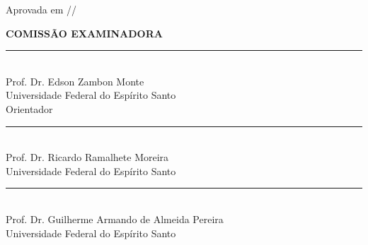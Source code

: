 \documentclass[
  12pt,
  a4paper,
  oneside,
  brazil,
  chapter=TITLE,
  section=TITLE
]{abntex2}
\begin{document}

\frenchspacing

\imprimircapa

\imprimirfolhaderosto

\begin{folhadeaprovacao}
  \begin{center}
    {\ABNTEXchapterfont\large\imprimirautor}
    \vspace*{\fill}\vspace*{\fill}
    \begin{center}
      \ABNTEXchapterfont\bfseries\Large\imprimirtitulo
    \end{center}
    \vspace*{\fill}
    \hspace{.45\textwidth}
    \begin{minipage}{.5\textwidth}
      \imprimirpreambulo
    \end{minipage}
    \vspace*{\fill}
  \end{center}
  Aprovada em \underline{\hspace{1cm}}/\underline{\hspace{1cm}}/\underline{\hspace{1.5cm}}
  \vspace*{\fill}
  \begin{center}
    \textbf{COMISSÃO EXAMINADORA}\\[1.5cm]
    \rule{8cm}{0.4pt}\\
    Prof. Dr. Edson Zambon Monte\\
    Universidade Federal do Espírito Santo\\
    Orientador\\[1.5cm]
    \rule{8cm}{0.4pt}\\
    Prof. Dr. Ricardo Ramalhete Moreira\\
    Universidade Federal do Espírito Santo\\[1.5cm]
    \rule{8cm}{0.4pt}\\
    Prof. Dr. Guilherme Armando de Almeida Pereira\\
    Universidade Federal do Espírito Santo
  \end{center}
\end{folhadeaprovacao}
\end{document}

